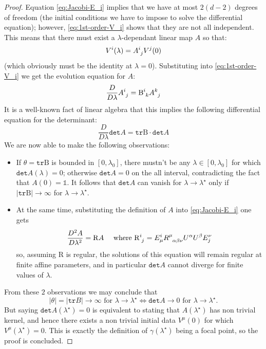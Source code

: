\begin{proof}
		Equation \eqref{eq:Jacobi-E_i} implies that we have at most \(2(d - 2)\) degrees of freedom (the initial conditions we have to impose to solve the differential equation); however, \eqref{eq:1st-order-V_i} shows that they are not all independent. This means that there must exist a \(\lambda\)-dependant linear map \(A\) so that:
		\[
		V^i(\lambda) = A\indices{^i_j}V^j(0)
		\]
		(which obviously must be the identity at \(\lambda = 0\)).
		Substituting into \eqref{eq:1st-order-V_i} we get the evolution equation for \(A\):
		\[
		\frac{D}{D\lambda}A\indices{^i_j} = \mathrm{B}\indices{^i_k}A\indices{^k_j}
		\]
		It is a well-known fact of linear algebra that this implies the following differential equation for the determinant: %
		\begin{equation}
		\label{eq;det-A}
			\frac{D}{D\lambda}\texttt{det}A = \texttt{tr}\mathrm{B}\cdot \texttt{det}A 
		\end{equation}
		We are now able to make the following observations:
		\begin{itemize}
			\item[\ding{99}] If \(\theta = \texttt{tr}\mathrm{B}\) is bounded in \([0, \lambda_0]\), there mustn't be any \(\lambda \in [0, \lambda_0]\) for which \(\texttt{det}A(\lambda) = 0\); otherwise \(\texttt{det}A = 0\) on the all interval, contradicting the fact that \(A(0) = \mathbb{1}\). It follows that \(\texttt{det}A\) can vanish for \(\lambda \rightarrow \lambda^{\star}\) only if \(\vert\texttt{tr}\mathrm{B}\vert \rightarrow \infty\) for \(\lambda \rightarrow \lambda^{\star}\).
			\item[\ding{99}] At the same time, substituting the definition of \(A\) into \eqref{eq:Jacobi-E_i} one gets
			\[
			\frac{D^2 A}{D\lambda^2} = \mathrm{R}A \quad \text{ where } \mathrm{R}\indices{^i_j} = E^i_{\mu}R\indices{^{\mu}_{\alpha\beta\nu}}U^{\alpha}U^{\beta}E_j^{\nu}
			\]
			so, assuming \(\mathrm{R}\) is regular, the solutions of this equation will remain regular at finite affine parameters, and in particular \(\texttt{det}A\) cannot diverge for finite values of \(\lambda\). 
		\end{itemize}
		From these \(2\) observations we may conclude that
		\[
		\vert\theta\vert = \vert\texttt{tr}B\vert \rightarrow \infty \text{ for } \lambda \rightarrow \lambda^{\star}\iff \texttt{det}A \rightarrow 0 \text{ for } \lambda \rightarrow \lambda^{\star}.
		\]
		But saying \(\texttt{det}A(\lambda^{\star}) = 0 \) is equivalent to stating that \(A(\lambda^{\star}) \) has non trivial kernel, and hence there exists a non trivial initial data \(V^{\mu}(0)\) for which \(V^{\mu}(\lambda^{\star}) = 0\). This is exactly the definition of \(\gamma(\lambda^{\star})\) being a focal point, so the proof is concluded.
	\end{proof}

